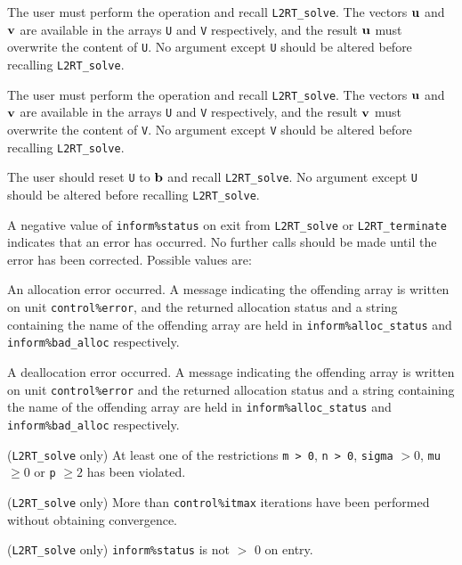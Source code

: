 \documentclass{galahad}
\newcommand{\packagename}{L2\-RT}
\begin{document}
\begin{description}

 The user must perform the operation
\disp{\bmu := \bmu + \bmA \bmv,}
and recall {\tt \packagename\_solve}.
The vectors ${\mathbf{u}}$ and ${\mathbf{v}}$ are available in the arrays {\tt U}
and {\tt V} respectively, and the result
${\mathbf{u}}$ must overwrite the content of {\tt U}.
No argument except {\tt U} should be altered before recalling
{\tt \packagename\_solve}.

 The user must perform the operation
and recall {\tt \packagename\_solve}.
The vectors ${\mathbf{u}}$ and ${\mathbf{v}}$ are available in the arrays {\tt U}
and {\tt V} respectively, and the result
${\mathbf{v}}$ must overwrite the content of {\tt V}.
No argument except {\tt V} should be altered before recalling
{\tt \packagename\_solve}.

  The user should reset {\tt U} to ${\mathbf{b}}$ and recall
{\tt \packagename\_solve}.
No argument except {\tt U} should be altered before recalling
{\tt \packagename\_solve}.
\end{description}


\galerrors
A negative value of  {\tt inform\%status} on exit from
{\tt \packagename\_solve}
or
{\tt \packagename\_terminate}
indicates that an error has occurred. No further calls should be made
until the error has been corrected. Possible values are:

\begin{description}
 An allocation error occurred. A message indicating
the offending
array is written on unit {\tt control\%error}, and the returned allocation
status and a string containing the name of the offending array
are held in {\tt inform\%alloc\_\-status}
and {\tt inform\%bad\_alloc} respectively.

 A deallocation error occurred.
A message indicating the offending
array is written on unit {\tt control\%error} and the returned allocation
status and a string containing the name of the offending array
are held in {\tt inform\%alloc\_\-status}
and {\tt inform\%bad\_alloc} respectively.

 ({\tt \packagename\_solve} only)
At least one of the restrictions
{\tt m > 0},
{\tt n > 0},
{\tt sigma} $> 0$,
{\tt mu} $\geq 0$
or
{\tt p} $\geq 2$
has been violated.

 ({\tt \packagename\_solve} only) More than
{\tt control\%itmax} iterations have been performed without obtaining
convergence.

 ({\tt \packagename\_solve} only)  {\tt inform\%status} is
not $>$ 0 on entry.

\end{description}
\end{document}
